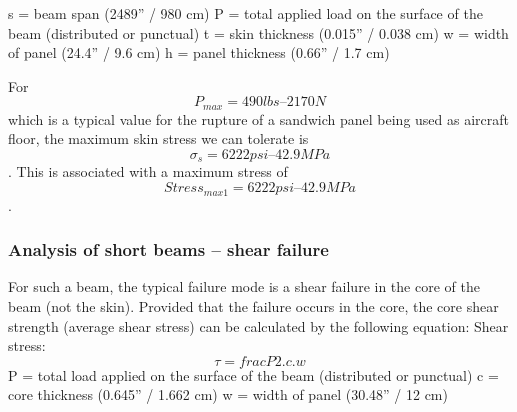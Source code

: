 s = beam span (2489” / 980 cm)
P = total applied load on the surface of the beam (distributed or punctual)
t = skin thickness (0.015” / 0.038 cm)
w = width of panel (24.4” / 9.6 cm)
h = panel thickness (0.66” / 1.7 cm)

For \[ P_{max} = 490 lbs – 2170 N\] which is a typical value for the rupture of a sandwich panel being used as aircraft floor, the maximum skin stress we can tolerate is \[ \sigma_{s} = 6222 psi – 42.9 MPa\].
This is associated with a maximum stress of \[ Stress_{max 1} = 6222 psi – 42.9 MPa\].
\subsubsection{Analysis of short beams – shear failure}
For such a beam, the typical failure mode is a shear failure in the core of the beam (not the skin). Provided that the failure occurs in the core, the core shear strength (average shear stress) can be calculated by the following equation:
Shear stress: \[ \tau = frac{P}{2.c.w} \]
P = total load applied on the surface of the beam (distributed or punctual)
c = core thickness (0.645” / 1.662 cm)
w = width of panel (30.48” / 12 cm)

